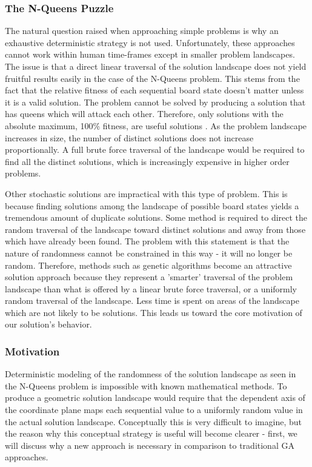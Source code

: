 \documentclass{sig-alternate}
\begin{document}
\subsubsection{The N-Queens Puzzle}
The natural question raised when approaching simple problems is why an exhaustive deterministic strategy is not used. Unfortunately, these approaches cannot work within human time-frames except in smaller problem landscapes. The issue is that a direct linear traversal of the solution landscape does not yield fruitful results easily in the case of the N-Queens problem. This stems from the fact that the relative fitness of each sequential board state doesn't matter unless it is a valid solution. The problem cannot be solved by producing a solution that has queens which will attack each other. Therefore, only solutions with the absolute maximum, 100\% fitness, are useful solutions \cite{crawford1992solving}. As the problem landscape increases in size, the number of distinct solutions does not increase proportionally. A full brute force traversal of the landscape would be required to find all the distinct solutions, which is increasingly expensive in higher order problems.

Other stochastic solutions are impractical with this type of problem. This is because finding solutions among the landscape of possible board states yields a tremendous amount of duplicate solutions. Some method is required to direct the random traversal of the landscape toward distinct solutions and away from those which have already been found. The problem with this statement is that the nature of randomness cannot be constrained in this way - it will no longer be random. Therefore, methods such as genetic algorithms become an attractive solution approach  because they represent a 'smarter' traversal of the problem landscape than what is offered by a linear brute force traversal, or a uniformly random traversal of the landscape\cite{srinivas1994genetic}. Less time is spent on areas of the landscape which are not likely to be solutions. This leads us toward the core motivation of our solution's behavior.

\subsubsection{Motivation}\label{motivation_section}
Deterministic modeling of the randomness of the solution landscape as seen in the N-Queens problem is impossible with known mathematical methods. To produce a geometric solution landscape would require that the dependent axis of the coordinate plane maps each sequential value to a uniformly random value in the actual solution landscape. Conceptually this is very difficult to imagine, but the reason why this conceptual strategy is useful will become clearer - first, we will discuss why a new approach is necessary in comparison to traditional GA approaches.
\end{document}
